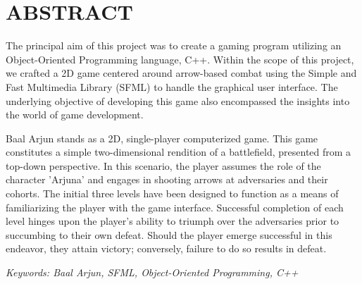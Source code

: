 

\newpage
\section*{ABSTRACT}

The principal aim of this project was to create a gaming program utilizing an Object-Oriented Programming language, C++. Within the scope of this project, we crafted a 2D game centered around arrow-based combat using the Simple and Fast Multimedia Library (SFML) to handle the graphical user interface. The underlying objective of developing this game also encompassed the insights into the world of game development.

Baal Arjun stands as a 2D, single-player computerized game. This game constitutes a simple two-dimensional rendition of a battlefield, presented from a top-down perspective. In this scenario, the player assumes the role of the character 'Arjuna' and engages in shooting arrows at adversaries and their cohorts. The initial three levels have been designed to function as a means of familiarizing the player with the game interface. Successful completion of each level hinges upon the player's ability to triumph over the adversaries prior to succumbing to their own defeat. Should the player emerge successful in this endeavor, they attain victory; conversely, failure to do so results in defeat.

\textit{Keywords: Baal Arjun, SFML, Object-Oriented Programming, C++}
